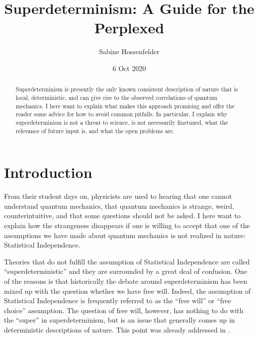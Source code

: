 \documentclass[12pt,A4]{article}
\begin{document}
\title{Superdeterminism: A Guide for the Perplexed}
\author{Sabine Hossenfelder}
\date{6 Oct 2020}
\maketitle
\vspace*{-1cm}


\begin{abstract}
Superdeterminism is presently the only known consistent description of nature that is local, deterministic,
and can give rise to the observed correlations of quantum mechanics. 
I here want to explain what makes this approach promising and offer the reader some advice for
how to avoid common pitfalls. In particular, I explain why superdeterminism is not a threat to science,
is not
necessarily finetuned, what the relevance of future input is, and what the open
problems are. 

\end{abstract}

\section{Introduction} 

From their student days on, physicists are used to hearing that one cannot understand quantum mechanics,
that quantum mechanics is strange, weird, counterintuitive, and that some questions should not be asked. 
I here want to explain how the strangeness disappears if one is willing to accept that one of the 
assumptions we have made about quantum mechanics is not realized in nature: Statistical Independence. 

Theories that do not
fulfill the assumption of Statistical Independence are called ``superdeterministic'' and they are
surrounded by a great deal of confusion. One of the reasons is that historically the debate around superdeterminism has
been mixed up with the question whether we have free will. Indeed,
the assumption of Statistical Independence is frequently referred to as the ``free will'' or ``free choice''
assumption. The
question of free will, however, has nothing to do with the ``super'' in superdeterminism,
but is an issue that generally comes up in deterministic descriptions of nature. This point
was already addressed in \cite{Hossenfelder:2019shy}.
\end{document}
